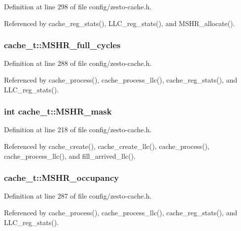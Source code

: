 Definition at line 298 of file config/zesto-cache.h.

Referenced by cache\_\-reg\_\-stats(), LLC\_\-reg\_\-stats(), and MSHR\_\-allocate().
\subsubsection[{MSHR\_\-full\_\-cycles}]{ {\bf cache\_\-t::MSHR\_\-full\_\-cycles}}\label{structcache__t_5743409570336e19ebd5f46a1d3ffdf6}




Definition at line 288 of file config/zesto-cache.h.

Referenced by cache\_\-process(), cache\_\-process\_\-llc(), cache\_\-reg\_\-stats(), and LLC\_\-reg\_\-stats().
\subsubsection[{MSHR\_\-mask}]{\setlength{\rightskip}{0pt plus 5cm}int {\bf cache\_\-t::MSHR\_\-mask}}\label{structcache__t_22958a10a2fa70e6e1ca99fa0ee55087}




Definition at line 218 of file config/zesto-cache.h.

Referenced by cache\_\-create(), cache\_\-create\_\-llc(), cache\_\-process(), cache\_\-process\_\-llc(), and fill\_\-arrived\_\-llc().
\subsubsection[{MSHR\_\-occupancy}]{ {\bf cache\_\-t::MSHR\_\-occupancy}}\label{structcache__t_deb4c181c0067b1652734b8d0820b859}




Definition at line 287 of file config/zesto-cache.h.

Referenced by cache\_\-process(), cache\_\-process\_\-llc(), cache\_\-reg\_\-stats(), and LLC\_\-reg\_\-stats().
